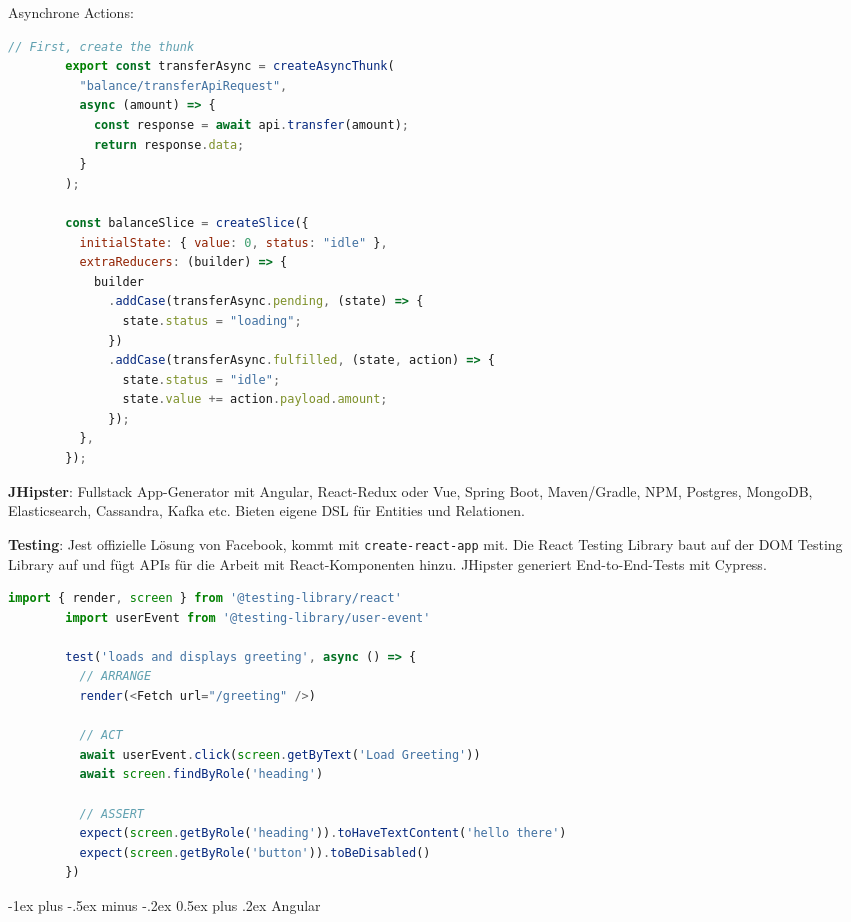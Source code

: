 \documentclass[10pt,landscape]{article}
\makeatletter
\renewcommand{\section}{\@startsection{section}{1}{0mm}%
{-1ex plus -.5ex minus -.2ex}%
{0.5ex plus .2ex}%
{\normalfont\large\bfseries}}
\makeatother
\begin{document}
\begin{multicols}{2}
        Asynchrone Actions:

        \begin{lstlisting}[belowskip=-0.8 \baselineskip, language=JavaScript]
        // First, create the thunk
        export const transferAsync = createAsyncThunk(
          "balance/transferApiRequest",
          async (amount) => {
            const response = await api.transfer(amount);
            return response.data;
          }
        );

        const balanceSlice = createSlice({
          initialState: { value: 0, status: "idle" },
          extraReducers: (builder) => {
            builder
              .addCase(transferAsync.pending, (state) => {
                state.status = "loading";
              })
              .addCase(transferAsync.fulfilled, (state, action) => {
                state.status = "idle";
                state.value += action.payload.amount;
              });
          },
        });
        \end{lstlisting}

        \textbf{JHipster}: Fullstack App-Generator mit Angular, React-Redux oder Vue, Spring Boot, Maven/Gradle, NPM, Postgres, MongoDB, Elasticsearch, Cassandra, Kafka etc.
        Bieten eigene DSL für Entities und Relationen.

        \textbf{Testing}: Jest offizielle Lösung von Facebook, kommt mit \lstinline{create-react-app} mit.
        Die React Testing Library baut auf der DOM Testing Library auf und fügt APIs für die Arbeit mit React-Komponenten hinzu.
        JHipster generiert End-to-End-Tests mit Cypress.

        \begin{lstlisting}[language=JavaScript]
        import { render, screen } from '@testing-library/react'
        import userEvent from '@testing-library/user-event'

        test('loads and displays greeting', async () => {
          // ARRANGE
          render(<Fetch url="/greeting" />)

          // ACT
          await userEvent.click(screen.getByText('Load Greeting'))
          await screen.findByRole('heading')

          // ASSERT
          expect(screen.getByRole('heading')).toHaveTextContent('hello there')
          expect(screen.getByRole('button')).toBeDisabled()
        })
        \end{lstlisting}


        \section{Angular}


\end{multicols}
\end{document}

